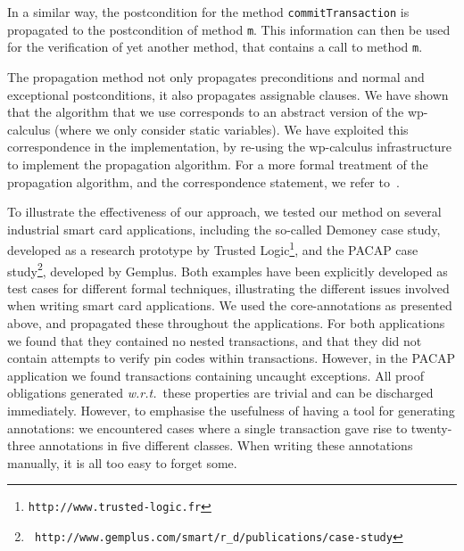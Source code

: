 In a similar way, the postcondition for the method
\texttt{commitTransaction} is propagated to the postcondition of
method \texttt{m}. This information can then be used for the
verification of yet another method, that contains a call to method
\texttt{m}. 

The propagation method not only propagates preconditions and normal
and exceptional postconditions, it also propagates assignable
clauses. We have shown that the algorithm that we use corresponds to
an abstract version of the wp-calculus (where we only consider
static variables). We have exploited this correspondence in the
implementation, by re-using the wp-calculus infrastructure to
implement the propagation algorithm. For a more formal treatment of
the propagation algorithm, and the correspondence statement, we refer
to~\cite{PavlovaBBHL04cardis}.

To illustrate the effectiveness of our approach, we tested our method
on several industrial smart card applications, including the so-called
Demoney case study, developed as a research prototype by Trusted
Logic\footnote{{\tt http://www.trusted-logic.fr}}, and the PACAP case
study\footnote{{\tt
http://www.gemplus.com/smart/r\_d/publications/case-study}}, developed
by Gemplus. Both examples have been explicitly developed as test cases
for different formal techniques, illustrating the different issues
involved when writing smart card applications. We used the
core-annotations as presented above, and propagated these throughout
the applications.  For both applications we found that they contained
no nested transactions, and that they did not contain attempts to
verify pin codes within transactions. However, in the PACAP
application we found transactions containing uncaught exceptions. All
proof obligations generated \emph{w.r.t.}~these properties are trivial
and can be discharged immediately. However, to emphasise the
usefulness of having a tool for generating annotations: we encountered
cases where a single transaction gave rise to twenty-three annotations
in five different classes. When writing these annotations manually, it
is all too easy to forget some.





